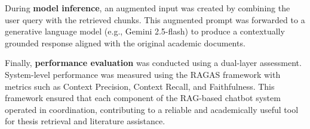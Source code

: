\begin{refsection}
During \textbf{model inference}, an augmented input was created by combining the user query with the retrieved chunks. This augmented prompt was forwarded to a generative language model (e.g., Gemini 2.5-flash) to produce a contextually grounded response aligned with the original academic documents.

Finally, \textbf{performance evaluation} was conducted using a dual-layer assessment. System-level performance was measured using the RAGAS framework with metrics such as Context Precision, Context Recall, and Faithfulness. This framework ensured that each component of the RAG-based chatbot system operated in coordination, contributing to a reliable and academically useful tool for thesis retrieval and literature assistance.

\clearpage

\printbibliography[heading=subbibintoc, title={\centering Notes}]
\end{refsection}
